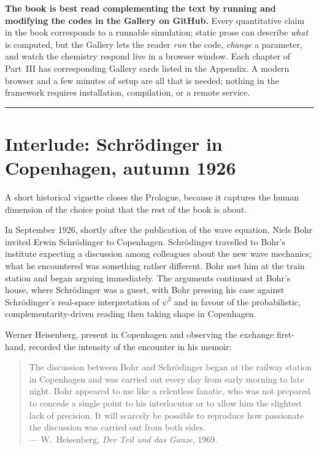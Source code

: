 \textbf{The book is best read complementing the text by running and modifying the codes in the Gallery on GitHub.} Every quantitative claim in the book corresponds to a runnable simulation; static prose can describe \emph{what} is computed, but the Gallery lets the reader \emph{run} the code, \emph{change} a parameter, and watch the chemistry respond live in a browser window. Each chapter of Part~III has corresponding Gallery cards listed in the Appendix. A modern browser and a few minutes of setup are all that is needed; nothing in the framework requires installation, compilation, or a remote service.

\bigskip
\hrule
\bigskip

\section*{Interlude: Schr\"odinger in Copenhagen, autumn 1926}

A short historical vignette closes the Prologue, because it captures the human dimension of the choice point that the rest of the book is about.

In September 1926, shortly after the publication of the wave equation, Niels Bohr invited Erwin Schr\"odinger to Copenhagen. Schr\"odinger travelled to Bohr's institute expecting a discussion among colleagues about the new wave mechanics; what he encountered was something rather different. Bohr met him at the train station and began arguing immediately. The arguments continued at Bohr's house, where Schr\"odinger was a guest, with Bohr pressing his case against Schr\"odinger's real-space interpretation of $\psi^2$ and in favour of the probabilistic, complementarity-driven reading then taking shape in Copenhagen.

Werner Heisenberg, present in Copenhagen and observing the exchange first-hand, recorded the intensity of the encounter in his memoir:

\begin{quote}
The discussion between Bohr and Schr\"odinger began at the railway station in Copenhagen and was carried out every day from early morning to late night. Bohr appeared to me like a relentless fanatic, who was not prepared to concede a single point to his interlocutor or to allow him the slightest lack of precision. It will scarcely be possible to reproduce how passionate the discussion was carried out from both sides.\\
\hfill --- W.~Heisenberg, \emph{Der Teil und das Ganze}, 1969.
\end{quote}

